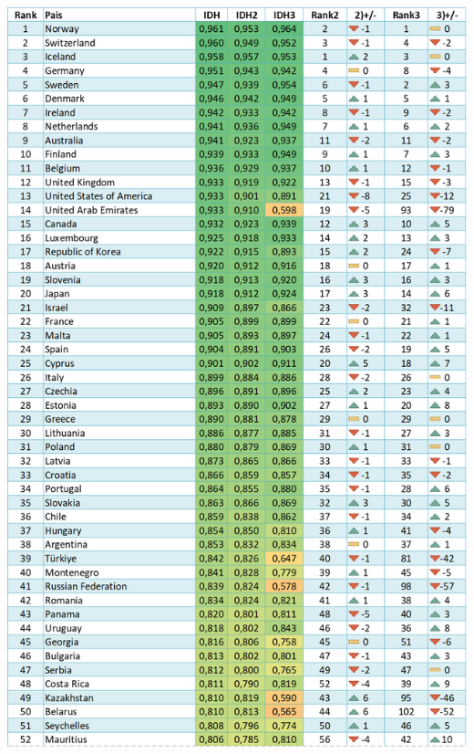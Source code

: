 \documentclass[
  10pt,
]{article}
\begin{document}
\begin{center}\includegraphics[width=0.75\linewidth]{Resultados/Tabla_IDH1} \end{center}

\pagebreak
\end{document}
